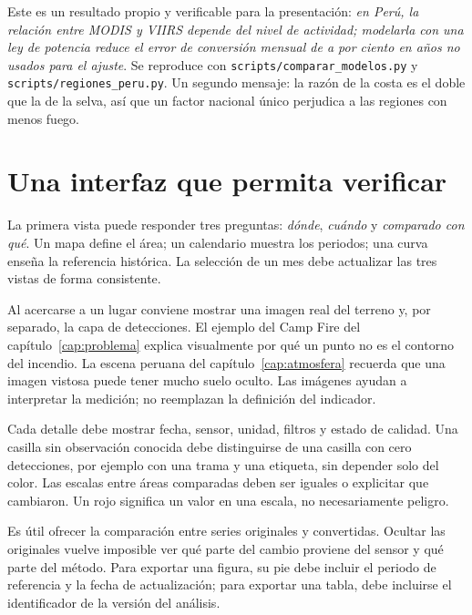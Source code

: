 \begin{parareto}
Este es un resultado propio y verificable para la presentación: \emph{en Perú, la relación
entre MODIS y VIIRS depende del nivel de actividad; modelarla con una ley de potencia reduce
el error de conversión mensual de \PeruWAPE{} a \PeruPotWAPE{} por ciento en años no usados
para el ajuste}. Se reproduce con \texttt{scripts/comparar\_modelos.py} y
\texttt{scripts/regiones\_peru.py}. Un segundo mensaje: la razón de la costa es el doble que
la de la selva, así que un factor nacional único perjudica a las regiones con menos fuego.
\end{parareto}

\FloatBarrier
\section{Una interfaz que permita verificar}

La primera vista puede responder tres preguntas: \emph{dónde}, \emph{cuándo} y
\emph{comparado con qué}. Un mapa define el área; un calendario muestra los periodos;
una curva enseña la referencia histórica. La selección de un mes debe actualizar las
tres vistas de forma consistente.

Al acercarse a un lugar conviene mostrar una imagen real del terreno y, por separado,
la capa de detecciones. El ejemplo del Camp Fire del capítulo~\ref{cap:problema} explica
visualmente por qué un punto no es el contorno del incendio. La escena peruana del
capítulo~\ref{cap:atmosfera} recuerda que una imagen vistosa puede tener mucho suelo
oculto. Las imágenes ayudan a interpretar la medición; no reemplazan la definición
del indicador.

Cada detalle debe mostrar fecha, sensor, unidad, filtros y estado de calidad. Una
casilla sin observación conocida debe distinguirse de una casilla con cero detecciones,
por ejemplo con una trama y una etiqueta, sin depender solo del color. Las escalas
entre áreas comparadas deben ser iguales o explicitar que cambiaron. Un rojo significa
un valor en una escala, no necesariamente peligro.

Es útil ofrecer la comparación entre series originales y convertidas. Ocultar las
originales vuelve imposible ver qué parte del cambio proviene del sensor y qué parte
del método. Para exportar una figura, su pie debe incluir el periodo de referencia y
la fecha de actualización; para exportar una tabla, debe incluirse el identificador
de la versión del análisis.

\FloatBarrier
